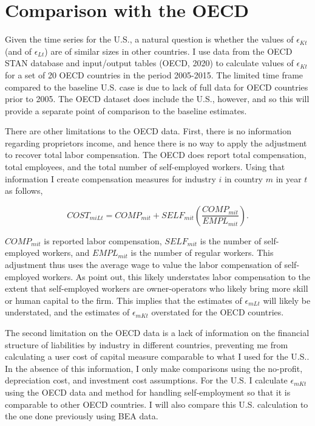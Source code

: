 \documentclass[11pt]{article}
\begin{document}
\section{Comparison with the OECD}
Given the time series for the U.S., a natural question is whether the values of $\epsilon_{Kt}$ (and of $\epsilon_{Lt}$) are of similar sizes in other countries. I use data from the OECD STAN database \citep{stan} and input/output tables (OECD, 2020) \nocite{oecdio} to calculate values of $\epsilon_{Kt}$ for a set of 20 OECD countries in the period 2005-2015. The limited time frame compared to the baseline U.S. case is due to lack of full data for OECD countries prior to 2005. The OECD dataset does include the U.S., however, and so this will provide a separate point of comparison to the baseline estimates.

There are other limitations to the OECD data. First, there is no information regarding proprietors income, and hence there is no way to apply the \cite{gommerupert2004} adjustment to recover total labor compensation. The OECD does report total compensation, total employees, and the total number of self-employed workers. Using that information I create compensation measures for industry $i$ in country $m$ in year $t$ as follows,

\begin{equation}
	COST_{miLt} = COMP_{mit} + SELF_{mit} \left(\frac{COMP_{mit}}{EMPL_{mit}}\right).
\end{equation}

$COMP_{mit}$ is reported labor compensation, $SELF_{mit}$ is the number of self-employed workers, and $EMPL_{mit}$ is the number of regular workers. This adjustment thus uses the average wage to value the labor compensation of self-employed workers. As \cite{gommerupert2004} point out, this likely understates labor compensation to the extent that self-employed workers are owner-operators who likely bring more skill or human capital to the firm. This implies that the estimates of $\epsilon_{mLt}$ will likely be understated, and the estimates of $\epsilon_{mKt}$ overstated for the OECD countries.

The second limitation on the OECD data is a lack of information on the financial structure of liabilities by industry in different countries, preventing me from calculating a user cost of capital measure comparable to what I used for the U.S.. In the absence of this information, I only make comparisons using the no-profit, depreciation cost, and investment cost assumptions. For the U.S. I calculate $\epsilon_{mKt}$ using the OECD data and method for handling self-employment so that it is comparable to other OECD countries. I will also compare this U.S. calculation to the one done previously using BEA data.
\end{document}
